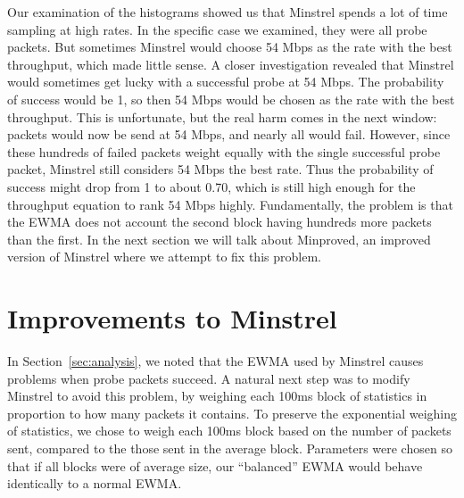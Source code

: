 \documentclass[twocolumn,10pt]{article}
\begin{document}
Our examination of the histograms showed us that Minstrel spends a lot
of time sampling at high rates.  In the specific case we examined, they
were all probe packets.  But sometimes Minstrel would choose 54 Mbps as
the rate with the best throughput, which made little sense.  A closer
investigation revealed that Minstrel would sometimes get lucky with a
successful probe at 54 Mbps.  The probability of success would be 1, so
then 54 Mbps would be chosen as the rate with the best throughput.  This
is unfortunate, but the real harm comes in the next window: packets
would now be send at 54 Mbps, and nearly all would fail.  However,
since these hundreds of failed packets weight equally with the single
successful probe packet, Minstrel still considers 54 Mbps the best
rate.  Thus the probability of success might drop from 1 to about 0.70,
which is still high enough for the throughput equation to rank 54 Mbps
highly.  Fundamentally, the problem is that the EWMA does not account
the second block having hundreds more packets than the first.  In the
next section we will talk about Minproved, an improved version of
Minstrel where we attempt to fix this problem.


\section{Improvements to Minstrel} \label{sec:minproved}

In Section~\ref{sec:analysis}, we noted that the EWMA used by Minstrel
causes problems when probe packets succeed.  A natural next step was
to modify Minstrel to avoid this problem, by weighing each 100ms block
of statistics in proportion to how many packets it contains.  To
preserve the exponential weighing of statistics, we chose to weigh
each 100ms block based on the number of packets sent, compared to the
those sent in the average block.  Parameters were chosen so that if
all blocks were of average size, our ``balanced'' EWMA would behave
identically to a normal EWMA.
\end{document}

